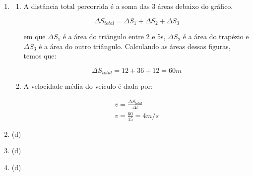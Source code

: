 \documentclass[12pt,letterpaper,fleqn]{article}
\begin{document}
\begin{enumerate}
    \item \begin{enumerate}
        \item A distância total percorrida é a soma das 3 áreas debaixo do gráfico.
        
        \begin{equation}
            \Delta S_{total} = \Delta S_1 + \Delta S_2 + \Delta S_3
        \end{equation}
        
        em que $\Delta S_1$ é a área do triângulo entre 2 e 5s, $\Delta S_2$ é a área do trapézio e $\Delta S_3$ é a área do outro triângulo. Calculando as áreas dessas figuras, temos que:
        
        \begin{equation}
            \Delta S_{total} = 12 + 36 + 12 = 60 m
        \end{equation}
        
        \item A velocidade média do veículo é dada por:
        
        \begin{equation}
            \begin{split}
                v = \frac{\Delta S_{total}}{\Delta t} \\
                v = \frac{60}{15} = 4 m/s
            \end{split}
        \end{equation}
    \end{enumerate}
    
    \item (d)
    
    \item (d)
    
    \item (d)
\end{enumerate}
\end{document}

